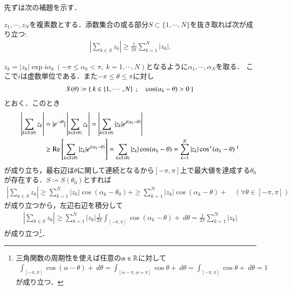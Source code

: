 	先ずは次の補題を示す．
	
	\begin{itembox}[l]{}
		\begin{lem}
			$z_1,\cdots,z_N$を複素数とする．添数集合の或る部分$S \subset \{1,\cdots,N\}$を抜き取れば次が成り立つ:
			\begin{align}
				\left| \sum_{k \in S} z_k \right| \geq \frac{1}{2\pi} \sum_{k=1}^{N} |z_k|.
			\end{align}
			\label{lem:total_variation_measure_bounded}
		\end{lem}
	\end{itembox}
	
	\begin{prf}[補題]
		$z_k = |z_k|\exp{i \alpha_k}\ (-\pi \leq \alpha_k < \pi,\ k=1,\cdots,N)$となるように$\alpha_1,\cdots,\alpha_N$を取る．
		ここで$i$は虚数単位である．また$-\pi \leq \theta \leq \pi$に対し
		\begin{align}
			S(\theta) \coloneqq \left\{\ k \in \{1,\cdots,N\}\ \, ; \quad \operatorname{cos}^{} (\alpha_k - \theta) > 0\ \right\}
		\end{align}
		とおく．このとき
		\begin{align}
			\left| \sum_{k \in S(\theta)} z_k \right| &= |\exp{-i\theta}|\left| \sum_{k \in S(\theta)} z_k \right| = \left| \sum_{k \in S(\theta)} |z_k|\exp{i(\alpha_k - \theta)} \right| \\
			&\geq \Re{\sum_{k \in S(\theta)} |z_k|\exp{i(\alpha_k - \theta)}} = \sum_{k \in S(\theta)} |z_k| \cos{(\alpha_k - \theta)}{} = \sum_{k=1}^{N} |z_k| \cos{(\alpha_k - \theta)}{+}
			\ \footnotemark
		\end{align}
		が成り立ち，最右辺は$\theta$に関して連続となるから$[-\pi,\pi]$上で最大値を達成する$\theta_0$が存在する．$S \coloneqq S(\theta_0)$とすれば
		\begin{align}
			\left| \sum_{k \in S} z_k \right| \geq \sum_{k=1}^{N} |z_k| \cos{(\alpha_k - \theta_0)}{+} \geq \sum_{k=1}^{N} |z_k| \cos{(\alpha_k - \theta)}{+}
			\quad (\forall \theta \in [-\pi, \pi])
		\end{align}
		が成り立つから，左辺右辺を積分して
		\begin{align}
			\left| \sum_{k \in S} z_k \right| \geq \sum_{k=1}^{N} |z_k| \frac{1}{2\pi} \int_{[-\pi,\pi]} \cos{(\alpha_k - \theta)}{+}\ d\theta
			= \frac{1}{2\pi} \sum_{k=1}^{N} |z_k|
		\end{align}
		が成り立つ\footnote{
			三角関数の周期性を使えば任意の$\alpha \in \mathbb{R}$に対して
			\begin{align}
				\int_{[-\pi,\pi]} \cos{(\alpha - \theta)}{+}\ d\theta = \int_{[\alpha-\pi,\alpha+\pi]} \cos{\theta}{+}\ d\theta = \int_{[-\pi,\pi]} \cos{\theta}{+}\ d\theta = 1
			\end{align}
			が成り立つ．
		}．
		\QED
	\end{prf}
	
